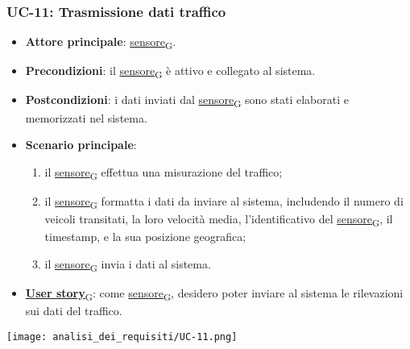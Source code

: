 \newpage
\subsubsection{UC-11: Trasmissione dati traffico}
\begin{itemize}
	\item \textbf{Attore principale}: \href{https://7last.github.io/docs/pb/documentazione-interna/glossario\#sensore}{sensore\textsubscript{G}}.
	\item \textbf{Precondizioni}: il \href{https://7last.github.io/docs/pb/documentazione-interna/glossario\#sensore}{sensore\textsubscript{G}} è attivo e collegato al sistema.
	\item \textbf{Postcondizioni}: i dati inviati dal \href{https://7last.github.io/docs/pb/documentazione-interna/glossario\#sensore}{sensore\textsubscript{G}} sono stati elaborati e memorizzati nel sistema.
	\item \textbf{Scenario principale}:
	      \begin{enumerate}
		      \item il \href{https://7last.github.io/docs/pb/documentazione-interna/glossario\#sensore}{sensore\textsubscript{G}} effettua una misurazione del traffico;
		      \item il \href{https://7last.github.io/docs/pb/documentazione-interna/glossario\#sensore}{sensore\textsubscript{G}} formatta i dati da inviare al sistema, includendo il numero di veicoli transitati, la loro velocità media, l'identificativo del \href{https://7last.github.io/docs/pb/documentazione-interna/glossario\#sensore}{sensore\textsubscript{G}},
		            il timestamp, e la sua posizione geografica;
		      \item il \href{https://7last.github.io/docs/pb/documentazione-interna/glossario\#sensore}{sensore\textsubscript{G}} invia i dati al sistema.
	      \end{enumerate}
	\item \href{https://7last.github.io/docs/pb/documentazione-interna/glossario\#user-story}{\textbf{User story}\textsubscript{G}}:
	      come \href{https://7last.github.io/docs/pb/documentazione-interna/glossario\#sensore}{sensore\textsubscript{G}}, desidero poter inviare al sistema le rilevazioni sui dati del traffico.
\end{itemize}
\begin{center}
	\texttt{[image: analisi\_dei\_requisiti/UC-11.png]}
\end{center}

